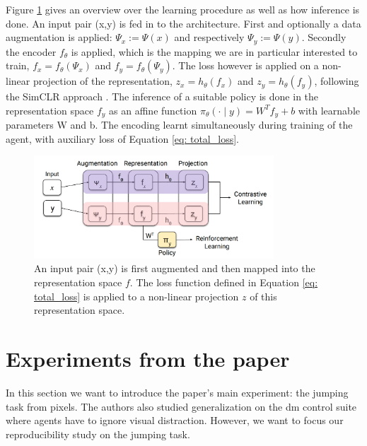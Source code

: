 \documentclass{usiinftr}
\begin{document}
Figure \ref{fig: Learning_Architecture} gives an overview over the learning procedure as well as how inference is done.
An input pair (x,y) is fed in to the architecture.
First and optionally a data augmentation is applied: $\Psi_x := \Psi(x)$ and respectively $\Psi_y := \Psi(y)$.
Secondly the encoder $f_\theta$ is applied, which is the mapping we are in particular interested to train, $f_x = f_\theta (\Psi_x)$ and $f_y = f_\theta (\Psi_y)$.
The loss however is applied on a non-linear projection of the representation, $z_x = h_\theta(f_x)$ and $z_y = h_\theta(f_y)$, following the SimCLR approach \cite{chen2020simple}.
The inference of a suitable policy is done in the representation space $f_y$ as an affine function $\pi_\theta (\cdot \mid y) = W^T f_y + b$
with learnable parameters W and b.
The encoding learnt simultaneously during training of the agent, with auxiliary loss of Equation \ref{eq: total_loss}.

\begin{figure}[h]
\centering
\includegraphics[width = 0.8\textwidth]{figures/Learning_architecture.png}
\caption{\label{fig: Learning_Architecture}An input pair (x,y) is first augmented and then mapped into the representation space $f$. The loss function defined in Equation \ref{eq: total_loss} is applied to a non-linear projection $z$ of this representation space. \cite{agarwal2021contrastive} }
\end{figure}


\section{Experiments from the paper}
In this section we want to introduce the paper's main experiment: the jumping task from pixels. The authors also studied generalization on the dm control suite where agents have to ignore visual distraction. However, we want to focus our reproducibility study on the jumping task.
\end{document}
